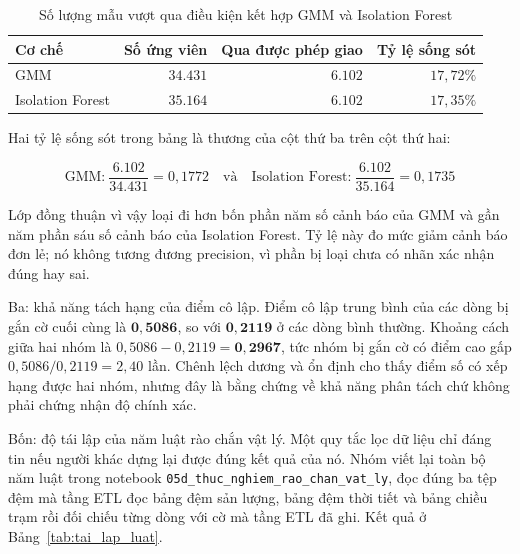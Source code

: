 \documentclass[12pt, a4paper]{report}
\begin{document}
\begin{table}[htbp]
\centering
\caption{Số lượng mẫu vượt qua điều kiện kết hợp GMM và Isolation Forest}
\label{tab:song_sot_and}
\small
\begin{tabular}{l r r r}
\toprule
\textbf{Cơ chế} & \textbf{Số ứng viên} & \textbf{Qua được phép giao} & \textbf{Tỷ lệ sống sót} \\
\midrule
GMM              & $34.431$ & $6.102$ & $17{,}72\%$ \\
Isolation Forest & $35.164$ & $6.102$ & $17{,}35\%$ \\
\bottomrule
\end{tabular}


\end{table}

Hai tỷ lệ sống sót trong bảng là thương của cột thứ ba trên cột thứ hai:

\begin{equation}
\text{GMM:}\ \frac{6.102}{34.431} = 0{,}1772 \quad\text{và}\quad
\text{Isolation Forest:}\ \frac{6.102}{35.164} = 0{,}1735
\end{equation}

Lớp đồng thuận vì vậy loại đi hơn bốn phần năm số cảnh báo của GMM và gần năm phần sáu số
cảnh báo của Isolation Forest. Tỷ lệ này đo mức giảm cảnh báo đơn lẻ; nó không tương
đương precision, vì phần bị loại chưa có nhãn xác nhận đúng hay sai.

Ba: khả năng tách hạng của điểm cô lập. Điểm cô lập trung bình của các dòng bị
gắn cờ cuối cùng là $\mathbf{0{,}5086}$, so với $\mathbf{0{,}2119}$ ở các dòng bình thường.
Khoảng cách giữa hai nhóm là $0{,}5086 - 0{,}2119 = \mathbf{0{,}2967}$, tức nhóm bị gắn cờ có
điểm cao gấp $0{,}5086 / 0{,}2119 = 2{,}40$ lần. Chênh lệch dương và ổn định cho thấy điểm số
có xếp hạng được hai nhóm, nhưng đây là bằng chứng về khả năng phân tách chứ không phải chứng
nhận độ chính xác.

Bốn: độ tái lập của năm luật rào chắn vật lý. Một quy tắc lọc dữ liệu chỉ đáng
tin nếu người khác dựng lại được đúng kết quả của nó. Nhóm viết lại toàn bộ năm luật trong
notebook \texttt{05d\_thuc\_nghiem\_rao\_chan\_vat\_ly}, đọc đúng ba tệp đệm mà tầng ETL đọc bảng
đệm sản lượng, bảng đệm thời tiết và bảng chiều trạm rồi đối chiếu từng dòng với cờ mà
tầng ETL đã ghi. Kết quả ở Bảng~\ref{tab:tai_lap_luat}.
\end{document}
